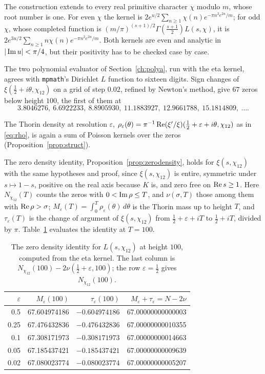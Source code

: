 The construction extends to every real primitive character $\chi$ modulo $m$, whose root number is one. For even $\chi$ the kernel is $2e^{u/2}\sum_{n\ge1}\chi(n)e^{-\pi n^2e^{2u}/m}$; for odd $\chi$, whose completed function is $(m/\pi)^{(s+1)/2}\Gamma(\frac{s+1}2)L(s,\chi)$, it is $2e^{3u/2}\sum_{n\ge1}n\chi(n)e^{-\pi n^2e^{2u}/m}$. Both kernels are even and analytic in $|\operatorname{Im} u|<\pi/4$, but their positivity has to be checked case by case.

The two polynomial evaluator of Section~\ref{ch:polya}, run with the eta kernel, agrees with \texttt{mpmath}'s Dirichlet $L$ function \cite{mpmath} to sixteen digits. Sign changes of $\xi(\frac12+i\theta,\chi_{12})$ on a grid of step $0.02$, refined by Newton's method, give $67$ zeros below height $100$, the first of them at
\[
3.8046276,\ 6.6922233,\ 8.8905930,\ 11.1883927,\ 12.9661788,\ 15.1814809,\ \dots.
\]

The Thorin density at resolution $\varepsilon$, $\rho_\varepsilon(\theta)=\pi^{-1}\operatorname{Re}(\xi'/\xi)(\frac12+\varepsilon+i\theta,\chi_{12})$ as in \eqref{eq:rho}, is again a sum of Poisson kernels over the zeros (Proposition~\ref{prop:struct}).

The zero density identity, Proposition~\ref{prop:zerodensity}, holds for $\xi(s,\chi_{12})$ with the same hypotheses and proof, since $\xi(s,\chi_{12})$ is entire, symmetric under $s\mapsto1-s$, positive on the real axis because $K$ is, and zero free on $\operatorname{Re} s\ge1$. Here $N_{\chi_{12}}(T)$ counts the zeros with $0<\operatorname{Im}\rho\le T$, and $\nu(\sigma,T)$ those among them with $\operatorname{Re}\rho>\sigma$; $M_\varepsilon(T)=\int_0^T\rho_\varepsilon(\theta)\,d\theta$ is the Thorin mass up to height $T$, and $\tau_\varepsilon(T)$ is the change of argument of $\xi(s,\chi_{12})$ from $\frac12+\varepsilon+iT$ to $\frac12+iT$, divided by $\pi$. Table~\ref{tab:ch16:zd} evaluates the identity at $T=100$.

\begin{table}[htbp]
\centering\small
\begin{tabular}{rrrr}
\toprule
$\varepsilon$ & $M_\varepsilon(100)$ & $\tau_\varepsilon(100)$ & $M_\varepsilon+\tau_\varepsilon=N-2\nu$\\
\midrule
0.5 & 67.604974186 & $-0.604974186$ & 67.00000000000003\\
0.25 & 67.476432836 & $-0.476432836$ & 67.00000000010355\\
0.1 & 67.308171973 & $-0.308171973$ & 67.00000000014663\\
0.05 & 67.185437421 & $-0.185437421$ & 67.00000000009639\\
0.02 & 67.080023774 & $-0.080023774$ & 67.00000000005207\\
\bottomrule
\end{tabular}
\caption{The zero density identity for $L(s,\chi_{12})$ at height $100$, computed from the eta kernel. The last column is $N_{\chi_{12}}(100)-2\nu(\frac12+\varepsilon,100)$; the row $\varepsilon=\frac12$ gives $N_{\chi_{12}}(100)$.}
\label{tab:ch16:zd}
\end{table}

